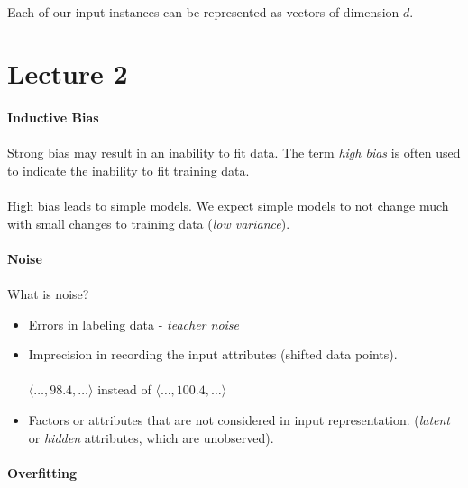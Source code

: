 \documentclass[letterpaper,12pt]{article}
\begin{document}
\paragraph{}Each of our input instances can be represented as vectors of dimension $d$. 
\section*{Lecture 2}
\paragraph{Inductive Bias}
\paragraph{}Strong bias may result in an inability to fit data. The term \textit{high bias} is often used to indicate
the inability to fit training data.
\paragraph{}High bias leads to simple models. We expect simple models to not change
much with small changes to training data (\textit{low variance}).
\paragraph{Noise}
\paragraph{}What is noise?
\begin{itemize}
    \item Errors in labeling data - \textit{teacher noise}
    \item Imprecision in recording the input attributes (shifted data points). 
           \paragraph{} $\langle \ldots, 98.4, \ldots \rangle$
            instead of
            $\langle \ldots, 100.4, \ldots \rangle$
        \item Factors or attributes that are not considered in input representation. (\textit{latent} or
            \textit{hidden} attributes, which are unobserved).
\end{itemize}
\paragraph{Overfitting}
\end{document}
